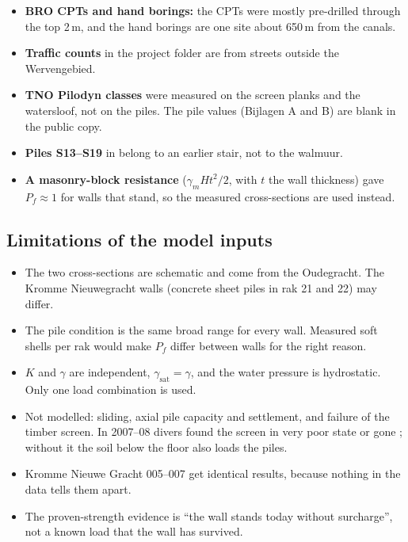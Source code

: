 \begin{itemize}
  \item \textbf{BRO CPTs and hand borings:} the CPTs were mostly pre-drilled
    through the top 2\,m, and the hand borings are one site about 650\,m
    from the canals.
  \item \textbf{Traffic counts} in the project folder are from streets outside
    the Wervengebied.
  \item \textbf{TNO Pilodyn classes} \cite{tno2009} were measured on the
    screen planks and the watersloof, not on the piles. The pile values
    (Bijlagen A and B) are blank in the public copy.
  \item \textbf{Piles S13--S19} in \cite{erfgoed156} belong to an earlier
    stair, not to the walmuur.
  \item \textbf{A masonry-block resistance} ($\gamma_m H t^2/2$, with $t$ the wall
    thickness) gave $P_f \approx 1$ for walls that
    stand, so the measured cross-sections are used instead.
\end{itemize}

\subsection{Limitations of the model inputs}\label{app:data-limits}

\begin{itemize}
  \item The two cross-sections are schematic and come from the Oudegracht.
    The Kromme Nieuwegracht walls (concrete sheet piles in rak 21 and 22) may
    differ.
  \item The pile condition is the same broad range for every wall. Measured
    soft shells per rak would make $P_f$ differ between walls for the right
    reason.
  \item $K$ and $\gamma$ are independent, $\gamma_\text{sat} = \gamma$, and the
    water pressure is hydrostatic. Only one load combination is used.
  \item Not modelled: sliding, axial pile capacity and settlement, and failure
    of the timber screen. In 2007--08 divers found the screen in very poor
    state or gone \cite{ibu2010}; without it the soil below the floor also
    loads the piles.
  \item Kromme Nieuwe Gracht 005--007 get identical results, because nothing
    in the data tells them apart.
  \item The proven-strength evidence is ``the wall stands today without
    surcharge'', not a known load that the wall has survived.
\end{itemize}
